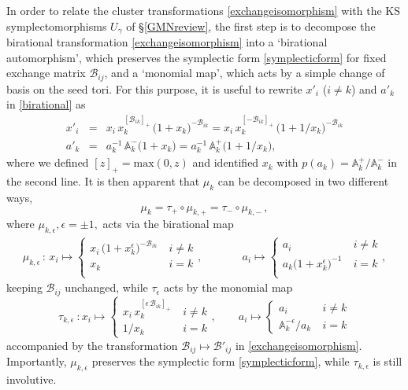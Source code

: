 \documentclass[12pt,reqno]{article}
\numberwithin{equation}{section}
\newcommand{\be}{\begin{equation}}
\newcommand{\ee}{\end{equation}}
\newcommand{\beq}{\begin{eqnarray}}
\newcommand{\eeq}{\end{eqnarray}}
\def\eps{\varepsilon}
\newcommand{\cB}{\mathcal{B}}
\newcommand{\exm}{\mathcal{B}}
\def\eps{\epsilon}
\numberwithin{equation}{section}
\begin{document}
In order to relate the cluster transformations  \eqref{exchangeisomorphism}
with the KS symplectomorphisms $U_\gamma$ of \S \ref{GMNreview}, the first step is to decompose the birational
transformation  \eqref{exchangeisomorphism} into a `birational automorphism',
which preserves the symplectic form \eqref{symplecticform} for fixed exchange
matrix $\cB_{ij}$, and a `monomial map', which acts by a simple change of
basis on the seed tori. For this purpose, it is useful to
rewrite $x'_i$ ($i\neq k$) and $a'_k$ in \eqref{birational} as
\beq
\label{rewritemut}
x'_i &=& x_i\,x_k^{[\exm_{ik} ]_+}\, \big(1+x_k\big)^{- \exm_{ik} } =
x_i\, x_k^{[-\exm_{ik} ]_+}\, \big(1+1/x_k\big)^{- \exm_{ik} }
\\
a'_k &=& a_k^{-1} \, \mathbb{A}_k^{-} \big(1+ x_k \big)=
a_k^{-1} \, \mathbb{A}_k^{+} \big(1+ 1/x_k \big),
\eeq
where we defined $[z]_+=\text{max}(0,z)$ and identified $x_k$ with $p(a_k)=\mathbb{A}_k^{+}/
\mathbb{A}_k^{-}$ in the second line. It is then apparent that $\mu_k$ can be decomposed in
two different ways,
\be
\mu_k = \tau_+ \circ \mu_{k,+} =  \tau_- \circ \mu_{k,-}\, ,
\ee
where $\mu_{k,\epsilon}, \epsilon=\pm 1,$ acts via the birational map
\beq
\mu_{k,\epsilon} \, :\, x_i \mapsto
 \left\{ \begin{array}{cc}
x_i\, \big(1+x_k^{\eps}\big)^{- \exm_{ik} } &\ i\neq k
\\
x_k &\ i=k
\\
\end{array}\right. ,
&\qquad &
a_i\mapsto
 \left\{ \begin{array}{cc}
a_i &\ i\neq k
\\
a_k\big(1+x_k^{\eps}\big)^{-1} &\ i=k
\\
\end{array}\right.  ,
\label{birationalautomorphism2}
\eeq
keeping $\exm_{ij}$ unchanged, while $\tau_{\eps}$ acts by the monomial map
\be
\label{tautrop}
\tau_{k,\epsilon}\ : x_i\mapsto
\left\{\begin{array}{cc} x_i\, x_k^{[\epsilon\,  \exm_{ik} ]_+} &\ i\neq k \\ 1/x_k &\ i=k
\end{array} \right.  ,
\qquad
a_i\mapsto
 \left\{ \begin{array}{cc}
a_i &\ i\neq k
\\
\mathbb{A}_k^{-\epsilon}/a_k &\ i=k
\end{array} \right.
\ee
accompanied by the transformation $\exm_{ij}\mapsto\exm'_{ij}$ in
\eqref{exchangeisomorphism}. Importantly, $\mu_{k,\epsilon}$
preserves the symplectic form \eqref{symplecticform}, while $\tau_{k,\epsilon}$
is still involutive.
\end{document}
